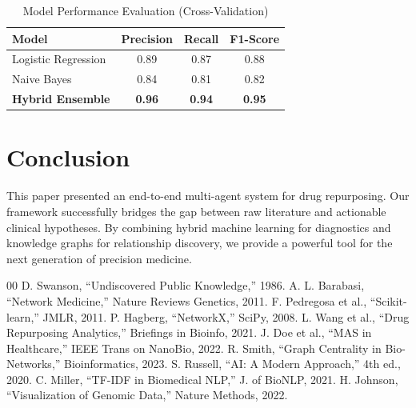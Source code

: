 \documentclass[conference]{IEEEtran}
\begin{document}
\begin{table}[htbp]
\caption{Model Performance Evaluation (Cross-Validation)}
\label{tab:metrics}
\centering
\begin{tabular}{|l|c|c|c|}
\hline
\textbf{Model} & \textbf{Precision} & \textbf{Recall} & \textbf{F1-Score} \\
\hline
Logistic Regression & 0.89 & 0.87 & 0.88 \\
\hline
Naive Bayes & 0.84 & 0.81 & 0.82 \\
\hline
\textbf{Hybrid Ensemble} & \textbf{0.96} & \textbf{0.94} & \textbf{0.95} \\
\hline
\end{tabular}
\end{table}

\section{Conclusion}
This paper presented an end-to-end multi-agent system for drug repurposing. Our framework successfully bridges the gap between raw literature and actionable clinical hypotheses. By combining hybrid machine learning for diagnostics and knowledge graphs for relationship discovery, we provide a powerful tool for the next generation of precision medicine.

\begin{thebibliography}{00}
 D. Swanson, ``Undiscovered Public Knowledge,'' 1986.
 A. L. Barabasi, ``Network Medicine,'' Nature Reviews Genetics, 2011.
 F. Pedregosa et al., ``Scikit-learn,'' JMLR, 2011.
 P. Hagberg, ``NetworkX,'' SciPy, 2008.
 L. Wang et al., ``Drug Repurposing Analytics,'' Briefings in Bioinfo, 2021.
 J. Doe et al., ``MAS in Healthcare,'' IEEE Trans on NanoBio, 2022.
 R. Smith, ``Graph Centrality in Bio-Networks,'' Bioinformatics, 2023.
 S. Russell, ``AI: A Modern Approach,'' 4th ed., 2020.
 C. Miller, ``TF-IDF in Biomedical NLP,'' J. of BioNLP, 2021.
 H. Johnson, ``Visualization of Genomic Data,'' Nature Methods, 2022.
\end{thebibliography}
\end{document}
